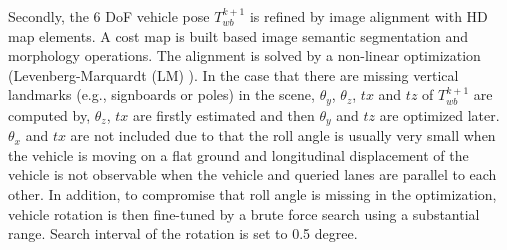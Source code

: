 \documentclass[letterpaper, 10 pt, conference]{ieeeconf}
\begin{document}





Secondly, the 6 DoF vehicle pose $T_{wb}^{k+1}$ is refined by image alignment with HD map elements. A cost map is built based image semantic segmentation and morphology operations. The alignment is solved by a non-linear optimization (Levenberg-Marquardt (LM) \cite{more1978levenberg}). In the case that there are missing vertical landmarks (e.g., signboards or poles) in the scene, $\theta_{y}$, $\theta_{z}$, $tx$ and $tz$ of $T_{wb}^{k+1}$ are computed by, $\theta_{z}$, $tx$ are firstly estimated and then $\theta_{y}$ and $tz$ are optimized later. $\theta_{x}$ and $tx$ are not included due to that the roll angle is usually very small when the vehicle is moving on a flat ground and longitudinal displacement of the vehicle is not observable when the vehicle and queried lanes are parallel to each other. In addition, to compromise that roll angle is missing in the optimization, vehicle rotation is then fine-tuned by a brute force search using a substantial range. Search interval of the rotation is set to 0.5 degree.



\end{document}
